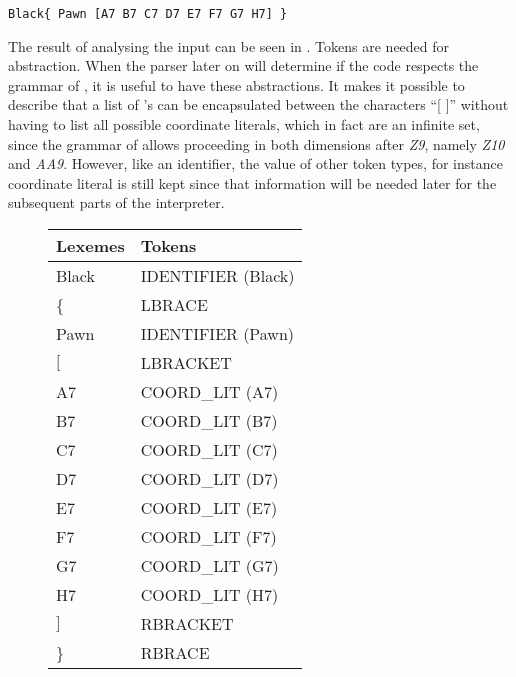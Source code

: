 \begin{lstlisting}
Black{ Pawn [A7 B7 C7 D7 E7 F7 G7 H7] }
\end{lstlisting}

The result of analysing the input can be seen in . Tokens are needed for abstraction. When the parser later on will determine if the code respects the grammar of \productname{}, it is useful to have these abstractions. It makes it possible to describe that a list of 's can be encapsulated between the characters ``[ ]'' without having to list all possible coordinate literals, which in fact are an infinite set, since the grammar of \productname{} allows proceeding in both dimensions after \textit{Z9}, namely \textit{Z10} and \textit{AA9}. However, like an identifier, the value of other token types, for instance coordinate literal is still kept since that information will be needed later for the subsequent parts of the interpreter.

\begin{figure}
\centering
\begin{tabular}{|l|l|}
        \hline
        Lexemes & Tokens             \\ \hline
        Black   & IDENTIFIER (Black) \\ 
        \{       & LBRACE             \\ 
        Pawn    & IDENTIFIER (Pawn)  \\ 
        $[$       & LBRACKET           \\ 
        A7      & COORD\_LIT (A7)     \\ 
        B7      & COORD\_LIT (B7)     \\ 
        C7      & COORD\_LIT (C7)     \\ 
        D7      & COORD\_LIT (D7)     \\ 
        E7      & COORD\_LIT (E7)     \\ 
        F7      & COORD\_LIT (F7)     \\ 
        G7      & COORD\_LIT (G7)     \\ 
        H7      & COORD\_LIT (H7)     \\ 
        $]$       & RBRACKET           \\ 
        \}       & RBRACE             \\
        \hline
\end{tabular}
\label{table:lexemestotokens}
\end{figure}

